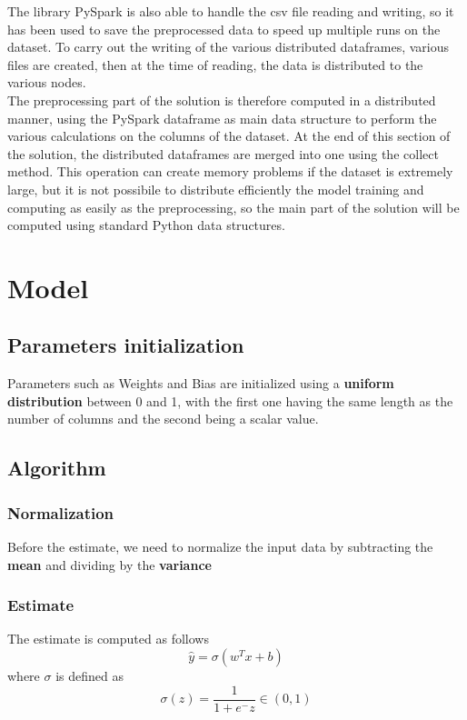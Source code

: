 \documentclass[
	letterpaper, %
	10pt, %
]{class}
\begin{document}
The library PySpark is also able to handle the csv file reading and writing, so it has been used to save the preprocessed data to speed up multiple runs on the dataset. To carry out the writing of the various distributed dataframes, various files are created, then at the time of reading, the data is distributed to the various nodes.\\

The preprocessing part of the solution is therefore computed in a distributed manner, using the PySpark dataframe as main data structure to perform the various calculations on the columns of the dataset.
At the end of this section of the solution, the distributed dataframes are merged into one using the collect method. This operation can create memory problems if the dataset is extremely large, but it is not possibile to distribute efficiently the model training
and computing as easily as the preprocessing, so the main part of the solution will be computed using standard Python data structures.


\section{Model}

\subsection{Parameters initialization}
Parameters such as Weights and Bias are initialized using a \textbf{uniform distribution} between 0 and 1, with the first one having the same length as the number of columns and the second being a scalar value.

\subsection{Algorithm}

\subsubsection{Normalization}
Before the estimate, we need to normalize the input data by subtracting the \textbf{mean} and dividing by the \textbf{variance}

\subsubsection{Estimate}
The estimate is computed as follows
$$ \hat{y} = \sigma(w^Tx + b) $$
where $\sigma$ is defined as
$$ \sigma(z) = \frac{1}{1 + e^-z} \in (0,1) $$
\end{document}

